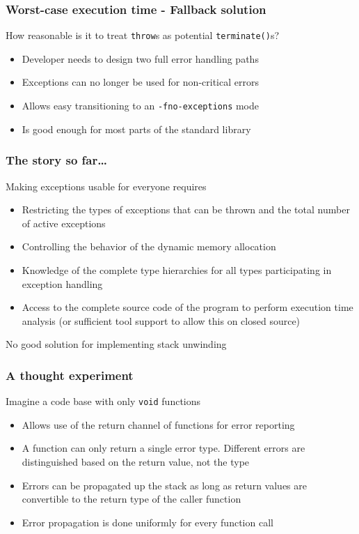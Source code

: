 \documentclass[aspectratio=169]{beamer}
\newif\iftransitions
\newcommand{\cpause}{\iftransitions \pause \fi}
\begin{document}
\begin{frame}
\frametitle{Worst-case execution time - Fallback solution}

How reasonable is it to treat \texttt{throw}s as potential \texttt{terminate()}s?

\begin{itemize}
\cpause \item Developer needs to design two full error handling paths
\cpause \item Exceptions can no longer be used for non-critical errors
\cpause \item Allows easy transitioning to an \texttt{-fno-exceptions} mode
\cpause \item Is good enough for most parts of the standard library
\end{itemize}

\end{frame}


\begin{frame}
  \frametitle{The story so far\ldots}

  Making exceptions usable for everyone requires
  \begin{itemize}
  \cpause \item Restricting the types of exceptions that can be thrown and the total number of active exceptions
  \cpause \item Controlling the behavior of the dynamic memory allocation
  \cpause \item Knowledge of the complete type hierarchies for all types participating in exception handling
  \cpause \item Access to the complete source code of the program to perform execution time analysis (or sufficient tool support to allow this on closed source)
  \end{itemize}

 \cpause 
  No good solution for implementing stack unwinding
\end{frame}


\begin{frame}
  \frametitle{A thought experiment}

  Imagine a code base with only \texttt{void} functions
  \begin{itemize}
  \cpause \item Allows use of the return channel of functions for error reporting
  \cpause \item A function can only return a single error type. Different errors are distinguished based on the return value, not the type
  \cpause \item Errors can be propagated up the stack as long as return values are convertible to the return type of the caller function
  \cpause \item Error propagation is done uniformly for every function call
  \end{itemize}
\end{frame}
\end{document}
